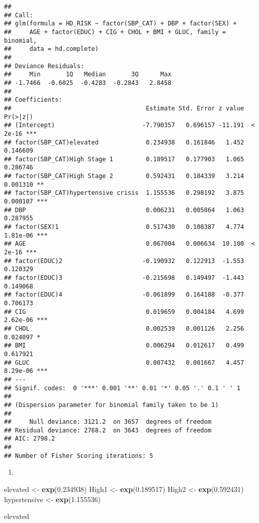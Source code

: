 \documentclass[
]{article}
\newenvironment{Shaded}{\begin{snugshade}}{\end{snugshade}}
\newcommand{\FloatTok}[1]{\textcolor[rgb]{0.00,0.00,0.81}{#1}}
\newcommand{\KeywordTok}[1]{\textcolor[rgb]{0.13,0.29,0.53}{\textbf{#1}}}
\newcommand{\NormalTok}[1]{#1}
\newcommand{\StringTok}[1]{\textcolor[rgb]{0.31,0.60,0.02}{#1}}
\begin{document}
\begin{verbatim}
## 
## Call:
## glm(formula = HD_RISK ~ factor(SBP_CAT) + DBP + factor(SEX) + 
##     AGE + factor(EDUC) + CIG + CHOL + BMI + GLUC, family = binomial, 
##     data = hd.complete)
## 
## Deviance Residuals: 
##     Min       1Q   Median       3Q      Max  
## -1.7466  -0.6025  -0.4283  -0.2843   2.8458  
## 
## Coefficients:
##                                     Estimate Std. Error z value Pr(>|z|)    
## (Intercept)                        -7.790357   0.696157 -11.191  < 2e-16 ***
## factor(SBP_CAT)elevated             0.234938   0.161846   1.452 0.146609    
## factor(SBP_CAT)High Stage 1         0.189517   0.177903   1.065 0.286746    
## factor(SBP_CAT)High Stage 2         0.592431   0.184339   3.214 0.001310 ** 
## factor(SBP_CAT)hypertensive crisis  1.155536   0.298192   3.875 0.000107 ***
## DBP                                 0.006231   0.005864   1.063 0.287955    
## factor(SEX)1                        0.517430   0.108387   4.774 1.81e-06 ***
## AGE                                 0.067004   0.006634  10.100  < 2e-16 ***
## factor(EDUC)2                      -0.190932   0.122913  -1.553 0.120329    
## factor(EDUC)3                      -0.215698   0.149497  -1.443 0.149068    
## factor(EDUC)4                      -0.061899   0.164188  -0.377 0.706173    
## CIG                                 0.019659   0.004184   4.699 2.62e-06 ***
## CHOL                                0.002539   0.001126   2.256 0.024097 *  
## BMI                                 0.006294   0.012617   0.499 0.617921    
## GLUC                                0.007432   0.001667   4.457 8.29e-06 ***
## ---
## Signif. codes:  0 '***' 0.001 '**' 0.01 '*' 0.05 '.' 0.1 ' ' 1
## 
## (Dispersion parameter for binomial family taken to be 1)
## 
##     Null deviance: 3121.2  on 3657  degrees of freedom
## Residual deviance: 2768.2  on 3643  degrees of freedom
## AIC: 2798.2
## 
## Number of Fisher Scoring iterations: 5
\end{verbatim}

\begin{enumerate}
\def\labelenumi{\roman{enumi})}
\setcounter{enumi}{1}
\item
\end{enumerate}

\begin{Shaded}
\begin{Highlighting}[]
\NormalTok{elevated <-}\StringTok{ }\KeywordTok{exp}\NormalTok{(}\FloatTok{0.234938}\NormalTok{)}
\NormalTok{High1 <-}\StringTok{ }\KeywordTok{exp}\NormalTok{(}\FloatTok{0.189517}\NormalTok{)}
\NormalTok{High2 <-}\StringTok{ }\KeywordTok{exp}\NormalTok{(}\FloatTok{0.592431}\NormalTok{)}
\NormalTok{hypertensive <-}\StringTok{ }\KeywordTok{exp}\NormalTok{(}\FloatTok{1.155536}\NormalTok{)}

\NormalTok{elevated }
\end{Highlighting}
\end{Shaded}
\end{document}

